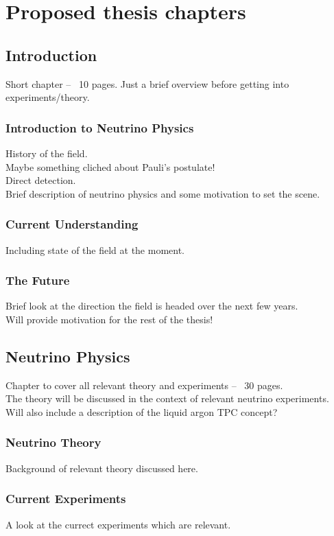 \documentclass[a4paper,12pt]{report}
\begin{document}
\chapter*{Proposed thesis chapters}
\renewcommand*\thesection{\arabic{section}}

\section{Introduction}
Short chapter -- ~10 pages. Just a brief overview before getting into experiments/theory.
\subsection{Introduction to Neutrino Physics}
History of the field.\\
Maybe something cliched about Pauli's postulate!\\
Direct detection.\\
Brief description of neutrino physics and some motivation to set the scene.
\subsection{Current Understanding}
Including state of the field at the moment.
\subsection{The Future}
Brief look at the direction the field is headed over the next few years.\\
Will provide motivation for the rest of the thesis!

\section{Neutrino Physics}
Chapter to cover all relevant theory and experiments -- ~30 pages.\\
The theory will be discussed in the context of relevant neutrino experiments.\\
Will also include a description of the liquid argon TPC concept?
\subsection{Neutrino Theory}
Background of relevant theory discussed here.
\subsection{Current Experiments}
A look at the currect experiments which are relevant.
\end{document}
